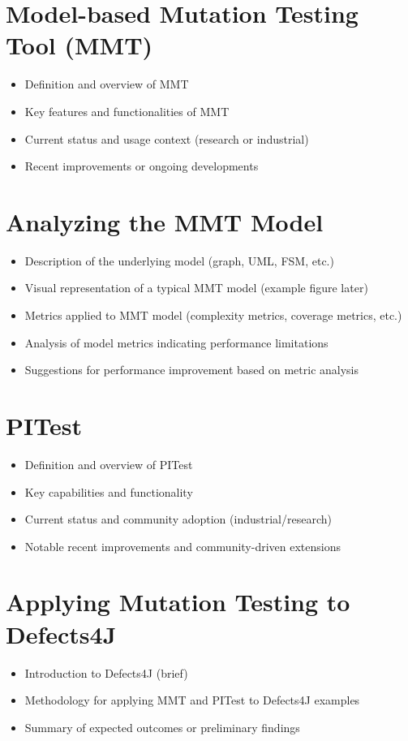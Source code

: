 \documentclass[sigplan, nonacm]{acmart}
\begin{document}
\section{Model-based Mutation Testing Tool (MMT)}
\begin{itemize}
    \item Definition and overview of MMT
    \item Key features and functionalities of MMT
    \item Current status and usage context (research or industrial)
    \item Recent improvements or ongoing developments
\end{itemize}

\section{Analyzing the MMT Model}
\begin{itemize}
    \item Description of the underlying model (graph, UML, FSM, etc.)
    \item Visual representation of a typical MMT model (example figure later)
    \item Metrics applied to MMT model (complexity metrics, coverage metrics, etc.)
    \item Analysis of model metrics indicating performance limitations
    \item Suggestions for performance improvement based on metric analysis
\end{itemize}

\section{PITest}
\begin{itemize}
    \item Definition and overview of PITest
    \item Key capabilities and functionality
    \item Current status and community adoption (industrial\slash research)
    \item Notable recent improvements and community-driven extensions
\end{itemize}

\section{Applying Mutation Testing to Defects4J}
\begin{itemize}
    \item Introduction to Defects4J (brief)
    \item Methodology for applying MMT and PITest to Defects4J examples
    \item Summary of expected outcomes or preliminary findings
\end{itemize}
\end{document}
